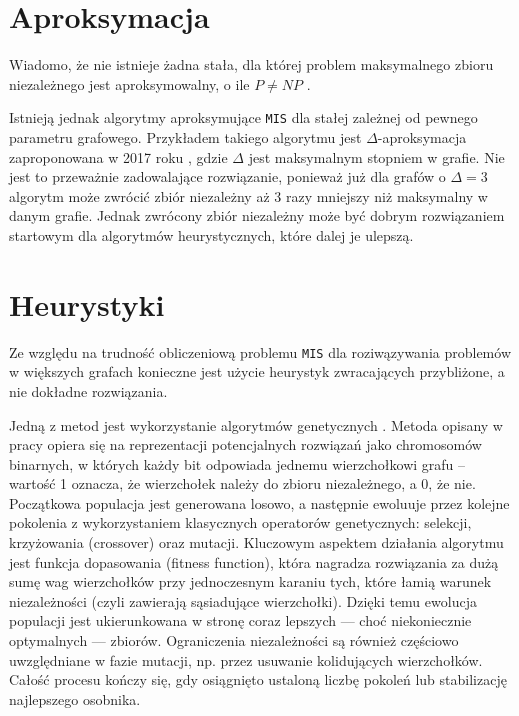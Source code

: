 \documentclass[12pt]{article}
\begin{document}
\section{Aproksymacja}

Wiadomo, że nie istnieje żadna stała, dla której problem maksymalnego zbioru niezależnego jest aproksymowalny, o ile $P \neq NP$ \cite{trevisan2014inapproximability}.

Istnieją jednak algorytmy aproksymujące \texttt{MIS} dla stałej zależnej od pewnego parametru grafowego. Przykładem takiego algorytmu jest $\Delta$-aproksymacja zaproponowana w 2017 roku \cite{bar2017distributed}, gdzie $\Delta$ jest maksymalnym stopniem w grafie. Nie jest to przeważnie zadowalające rozwiązanie, ponieważ już dla grafów o $\Delta=3$ algorytm może zwrócić zbiór niezależny aż 3 razy mniejszy niż maksymalny w danym grafie. Jednak zwrócony zbiór niezależny może być dobrym rozwiązaniem startowym dla algorytmów heurystycznych, które dalej je ulepszą.

\section{Heurystyki}

Ze względu na trudność obliczeniową problemu \texttt{MIS} dla roziwązywania problemów w większych grafach konieczne jest użycie heurystyk zwracających przybliżone, a nie dokładne rozwiązania.

Jedną z metod jest wykorzystanie algorytmów genetycznych \cite{nayeem2007genetic}. Metoda opisany w pracy opiera się na reprezentacji potencjalnych rozwiązań jako chromosomów binarnych, w których każdy bit odpowiada jednemu wierzchołkowi grafu – wartość 1 oznacza, że wierzchołek należy do zbioru niezależnego, a 0, że nie. Początkowa populacja jest generowana losowo, a następnie ewoluuje przez kolejne pokolenia z wykorzystaniem klasycznych operatorów genetycznych: selekcji, krzyżowania (crossover) oraz mutacji. Kluczowym aspektem działania algorytmu jest funkcja dopasowania (fitness function), która nagradza rozwiązania za dużą sumę wag wierzchołków przy jednoczesnym karaniu tych, które łamią warunek niezależności (czyli zawierają sąsiadujące wierzchołki). Dzięki temu ewolucja populacji jest ukierunkowana w stronę coraz lepszych — choć niekoniecznie optymalnych — zbiorów. Ograniczenia niezależności są również częściowo uwzględniane w fazie mutacji, np. przez usuwanie kolidujących wierzchołków. Całość procesu kończy się, gdy osiągnięto ustaloną liczbę pokoleń lub stabilizację najlepszego osobnika.
\end{document}
